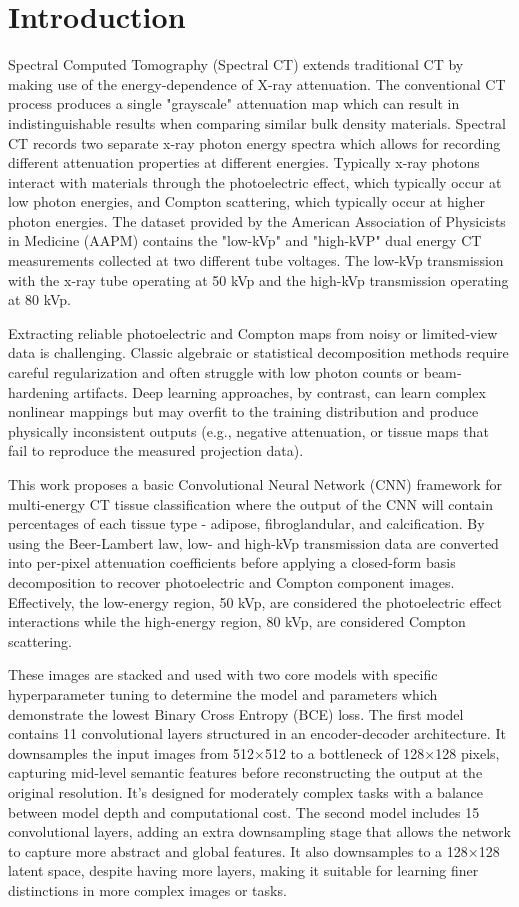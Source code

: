 \section{Introduction}\label{sec:introduction}

Spectral Computed Tomography (Spectral CT) extends traditional CT by making use of the energy-dependence of
X-ray attenuation. The conventional CT process produces a single "grayscale" attenuation map which
can result in indistinguishable results when comparing similar bulk density materials. Spectral CT records
two separate x-ray photon energy spectra which allows for recording different attenuation properties
at different energies. Typically x-ray photons interact with materials through the photoelectric effect,
which typically occur at low photon energies, and Compton scattering, which typically occur at higher
photon energies. The dataset provided by the American Association of Physicists in Medicine (AAPM)
contains the "low-kVp" and "high-kVP" dual energy CT measurements collected at two different tube
voltages. The low-kVp transmission with the x-ray tube operating at 50 kVp and the high-kVp transmission 
operating at 80 kVp.

Extracting reliable photoelectric and Compton maps from noisy or limited‐view data is challenging. Classic
algebraic or statistical decomposition methods require careful regularization and often struggle with low
photon counts or beam‐hardening artifacts. Deep learning approaches, by contrast, can learn complex nonlinear
mappings but may overfit to the training distribution and produce physically inconsistent outputs (e.g.,
negative attenuation, or tissue maps that fail to reproduce the measured projection data).

This work proposes a basic Convolutional Neural Network (CNN) framework for multi‐energy CT tissue classification
where the output of the CNN will contain percentages of each tissue type - adipose, fibroglandular, and calcification.
By using the Beer-Lambert law, low- and high-kVp transmission data are converted into per‐pixel attenuation coefficients
before applying a closed-form basis decomposition to recover photoelectric and Compton component images. Effectively,
the low-energy region, 50 kVp, are considered the photoelectric effect interactions while the high-energy region, 80 kVp, 
are considered Compton scattering. 

These images are stacked and used with two core models with specific hyperparameter tuning to determine the model and
parameters which demonstrate the lowest Binary Cross Entropy (BCE) loss. The first model contains 11 convolutional layers 
structured in an encoder-decoder architecture. It downsamples the input images from 512×512 to a bottleneck of 128×128 
pixels, capturing mid-level semantic features before reconstructing the output at the original resolution. It's designed 
for moderately complex tasks with a balance between model depth and computational cost. The second model includes 15 
convolutional layers, adding an extra downsampling stage that allows the network to capture more abstract and global 
features. It also downsamples to a 128×128 latent space, despite having more layers, making it suitable for learning 
finer distinctions in more complex images or tasks.

